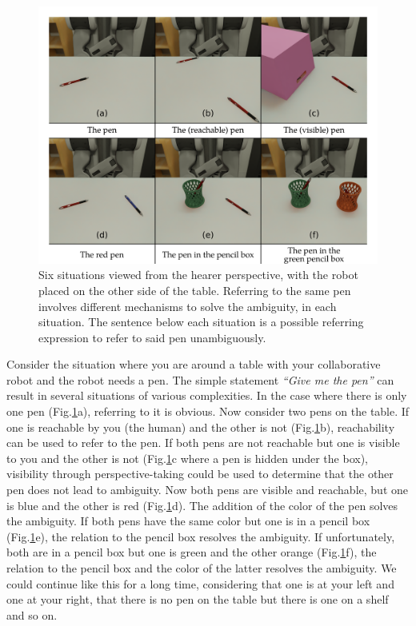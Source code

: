 \begin{figure}[ht!]
\centering
\includegraphics[scale=0.16]{figures/chapter4/intro.png}
\caption{\label{fig:chap4_intro} Six situations viewed from the hearer perspective, with the robot placed on the other side of the table. Referring to the same pen involves different mechanisms to solve the ambiguity, in each situation. The sentence below each situation is a possible referring expression to refer to said pen unambiguously. }
\end{figure}

Consider the situation where you are around a table with your collaborative robot and the robot needs a pen. The simple statement \textit{``Give me the pen''} can result in several situations of various complexities. In the case where there is only one pen (Fig.\ref{fig:chap4_intro}a), referring to it is obvious. Now consider two pens on the table. If one is reachable by you (the human) and the other is not (Fig.\ref{fig:chap4_intro}b), reachability can be used to refer to the pen. If both pens are not reachable but one is visible to you and the other is not (Fig.\ref{fig:chap4_intro}c where a pen is hidden under the box), visibility through perspective-taking could be used to determine that the other pen does not lead to ambiguity. Now both pens are visible and reachable, but one is blue and the other is red (Fig.\ref{fig:chap4_intro}d). The addition of the color of the pen solves the ambiguity. If both pens have the same color but one is in a pencil box (Fig.\ref{fig:chap4_intro}e), the relation to the pencil box resolves the ambiguity. If unfortunately, both are in a pencil box but one is green and the other orange (Fig.\ref{fig:chap4_intro}f), the relation to the pencil box and the color of the latter resolves the ambiguity. We could continue like this for a long time, considering that one is at your left and one at your right, that there is no pen on the table but there is one on a shelf and so on.

